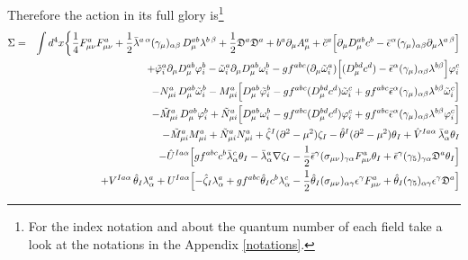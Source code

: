 \begin{appendix}
\noindent Therefore the action in its full glory is\footnote{For the index notation and about the quantum number of each field take a look at the notations in the Appendix \ref{notations}.}
\begin{eqnarray}
\label{fullact2}
\Sigma &=& \int d^{4}x \biggl\{ 
\frac{1}{4}F^{a}_{\mu \nu}F^{a}_{\mu\nu} 
+ \frac{1}{2}\bar{\lambda}^{a\,\alpha} (\gamma_{\mu})_{\alpha\beta}\,D^{ab}_{\mu}\lambda^{b\,\beta}
+ \frac{1}{2}\mathfrak{D}^{a}\mathfrak{D}^{a}
+ b^{a}\partial_{\mu}A^{a}_{\mu}
+ \check{c}^{a}\Bigl[\partial_{\mu}D^{ab}_{\mu}c^{b}
- \bar{\epsilon}^{\alpha}(\gamma_{\mu})_{\alpha\beta}\partial_{\mu}\lambda^{a\,\beta}\Bigr]\nonumber \\
&&
+\tilde{\varphi}^{a}_{i}\partial_{\mu}D_{\mu}^{ab}\varphi^{b}_{i}
-\tilde{\omega}^{a}_{i}\partial_{\mu}D_{\mu}^{ab}\omega^{b}_{i}
-gf^{abc}(\partial_{\mu}\tilde{\omega}^{a}_{i})\Bigl[(D^{bd}_{\mu}c^{d})
-\bar{\epsilon}^\alpha(\gamma_\mu)_{\alpha\beta}\lambda^{b\beta}\Bigl]
\varphi^{c}_{i}\nonumber\\
&&
-{N}^{a}_{\mu{i}}\,D^{ab}_{\mu}\tilde{\omega}^{b}_{i}
-{M}^{a}_{\mu{i}}\Bigl[D^{ab}_{\mu}\tilde{\varphi}^{b}_{i}
-gf^{abc}(D^{bd}_{\mu}c^{d})\tilde{\omega}^{c}_{i}
+gf^{abc}\bar{\epsilon}^{\alpha}(\gamma_{\mu})_{\alpha\beta}\lambda^{b\beta}\tilde{\omega}^{c}_{i}\Bigr]\nonumber \\
&&
-\tilde{M}^{a}_{\mu{i}}\,D^{ab}_{\mu}\varphi^{b}_{i}
+\tilde{N}^{a}_{\mu{i}}\Bigl[D^{ab}_{\mu}\omega^{b}_{i}
- gf^{abc}(D^{bd}_{\mu}c^{d})\varphi^{c}_{i}
+ gf^{abc}\bar{\epsilon}^{\alpha}(\gamma_{\mu})_{\alpha\beta}\lambda^{b\beta}\varphi^{c}_{i}\Bigr]\nonumber \\
&&
- \tilde{M}^{a}_{\mu{i}}{M}^{a}_{\mu{i}}
+ \tilde{N}^{a}_{\mu{i}}{N}^{a}_{\mu{i}}
+ \hat{\zeta}^{I}(\partial^{2}-\mu^{2})\zeta_{I}
- \hat{\theta}^{I}(\partial^{2}-\mu^{2})\theta_{I}
+ \hat{V}^{Ia\alpha}\,\bar{\lambda}^{a}_{\alpha}\theta_{I}\nonumber \\
&&
- \hat{U}^{Ia\alpha}\Bigl[gf^{abc}c^{b}\bar{\lambda}^{c}_{\alpha}\theta_{I}
-\bar{\lambda}^{a}_{\alpha}\nabla\zeta_{I}
-\frac{1}{2}\bar{\epsilon}^{\gamma}(\sigma_{\mu\nu})_{\gamma\alpha}F^{a}_{\mu\nu}\theta_{I} 
+\bar{\epsilon}^{\gamma}(\gamma_{5})_{\gamma\alpha}\mathfrak{D}^{a}\theta_{I}\Bigr]\nonumber \\
&&
+ V^{Ia\alpha}\,\hat{\theta}_{I}\lambda^{a}_{\alpha}
+ U^{Ia\alpha}\Bigl[-\hat{\zeta}_{I}\lambda^{a}_{\alpha}
+ gf^{abc}\hat{\theta}_{I}c^{b}\lambda^{c}_{\alpha}
- \frac{1}{2}\hat{\theta}_{I}(\sigma_{\mu\nu})_{\alpha\gamma}\epsilon^{\gamma}F^{a}_{\mu\nu}  
+ \hat{\theta}_{I}(\gamma_{5})_{\alpha\gamma}\epsilon^{\gamma}\mathfrak{D}^{a}\Bigr] \nonumber \\

\end{eqnarray}
\end{appendix}
